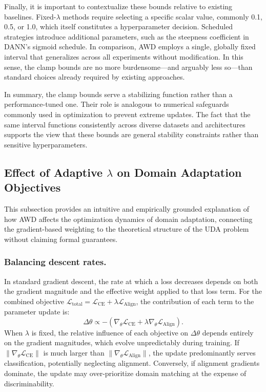 \documentclass[pdflatex,sn-mathphys-num]{sn-jnl}
\theoremstyle{thmstyleone}
\theoremstyle{thmstyletwo}
\theoremstyle{thmstylethree}
\begin{document}
Finally, it is important to contextualize these bounds relative to existing baselines. Fixed-$\lambda$ methods require selecting a specific scalar value, commonly 0.1, 0.5, or 1.0, which itself constitutes a hyperparameter decision. Scheduled strategies introduce additional parameters, such as the steepness coefficient in DANN’s sigmoid schedule. In comparison, AWD employs a single, globally fixed interval that generalizes across all experiments without modification. In this sense, the clamp bounds are no more burdensome—and arguably less so—than standard choices already required by existing approaches.

In summary, the clamp bounds serve a stabilizing function rather than a performance-tuned one. Their role is analogous to numerical safeguards commonly used in optimization to prevent extreme updates. The fact that the same interval functions consistently across diverse datasets and architectures supports the view that these bounds are general stability constraints rather than sensitive hyperparameters.


\subsection{Effect of Adaptive \texorpdfstring{$\lambda$}{lambda} on Domain Adaptation Objectives}
\label{sec:effect_adaptive_lambda}

This subsection provides an intuitive and empirically grounded explanation of how AWD affects the optimization dynamics of domain adaptation, connecting the gradient-based weighting to the theoretical structure of the UDA problem without claiming formal guarantees.

\subsubsection{Balancing descent rates.}
In standard gradient descent, the rate at which a loss decreases depends on both the gradient magnitude and the effective weight applied to that loss term. For the combined objective $\mathcal{L}_{\text{total}} = \mathcal{L}_{\text{CE}} + \lambda \mathcal{L}_{\text{Align}}$, the contribution of each term to the parameter update is:
\begin{equation*}
\Delta \theta \propto -\left( \nabla_\theta \mathcal{L}_{\text{CE}} + \lambda \nabla_\theta \mathcal{L}_{\text{Align}} \right).
\end{equation*}
When $\lambda$ is fixed, the relative influence of each objective on $\Delta \theta$ depends entirely on the gradient magnitudes, which evolve unpredictably during training. If $\|\nabla_\theta \mathcal{L}_{\text{CE}}\|$ is much larger than $\|\nabla_\theta \mathcal{L}_{\text{Align}}\|$, the update predominantly serves classification, potentially neglecting alignment. Conversely, if alignment gradients dominate, the update may over-prioritize domain matching at the expense of discriminability.
\end{document}
